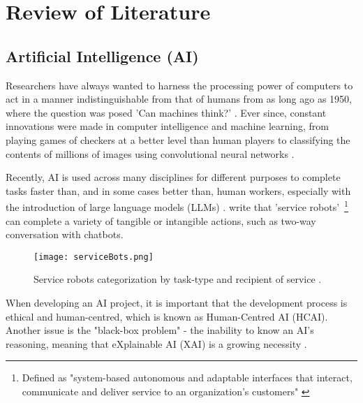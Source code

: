 




\section{Review of Literature}

\subsection{Artificial Intelligence (AI)}

Researchers have always wanted to harness the processing power of computers to act in a manner 
indistinguishable from that of humans from as long ago as 1950, where the question was posed 
'Can machines think?' \autocite{turing_icomputing_1950}. Ever since, constant innovations were made in computer 
intelligence and machine learning, from playing games of checkers at a better level than human players \autocite{samuel_studies_1959}
to classifying the contents of millions of images using convolutional neural networks \autocite{krizhevsky_imagenet_2012}.

Recently, AI is used across many disciplines for different purposes to complete tasks faster than, and in some cases better than,
human workers, especially with the introduction of large language models (LLMs) \autocite{AIDigitalAssistants}. \textcite{wirtz_brave_2018} write that 'service robots'~\footnote{Defined as "system-based autonomous and adaptable interfaces that 
interact, communicate and deliver service to an organization’s customers" \autocite[p.909]{wirtz_brave_2018}} can complete a variety of 
tangible or intangible actions, such as two-way conversation with chatbots.

\begin{figure}[H]
    \centering
    \texttt{[image: serviceBots.png]}
    \caption{Service robots categorization by task-type and recipient of service \autocite{wirtz_brave_2018}.}
    \label{fig:serviceBots}
\end{figure}

When developing an AI project, it is important that the development process
is ethical and human-centred, which is known as Human-Centred AI (HCAI). 
Another issue is the "black-box problem" - the inability to know an AI's reasoning, meaning that 
eXplainable AI (XAI) is a growing necessity \autocite{miro-nicolau_comprehensive_2025}. 


